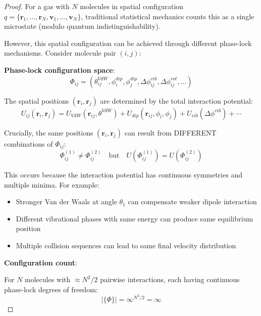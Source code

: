 \documentclass[12pt,a4paper]{article}
\theoremstyle{remark}
\begin{document}
\begin{proof}
For a gas with $N$ molecules in spatial configuration $q = \{\mathbf{r}_1, \ldots, \mathbf{r}_N, \mathbf{v}_1, \ldots, \mathbf{v}_N\}$, traditional statistical mechanics counts this as a single microstate (modulo quantum indistinguishability).

However, this spatial configuration can be achieved through different phase-lock mechanisms. Consider molecule pair $(i,j)$:

\textbf{Phase-lock configuration space}:
\begin{equation}
\Phi_{ij} = (\theta^{VdW}_{ij}, \phi^{dip}_i, \phi^{dip}_j, \Delta\phi^{vib}_{ij}, \Delta\phi^{rot}_{ij}, \ldots)
\end{equation}

The spatial positions $(\mathbf{r}_i, \mathbf{r}_j)$ are determined by the total interaction potential:
\begin{equation}
U_{ij}(\mathbf{r}_i, \mathbf{r}_j) = U_{VdW}(\mathbf{r}_{ij}, \theta^{VdW}) + U_{dip}(\mathbf{r}_{ij}, \phi_i, \phi_j) + U_{vib}(\Delta\phi^{vib}) + \cdots
\end{equation}

Crucially, the same positions $(\mathbf{r}_i, \mathbf{r}_j)$ can result from DIFFERENT combinations of $\Phi_{ij}$:
\begin{equation}
\Phi^{(1)}_{ij} \neq \Phi^{(2)}_{ij} \quad \text{but} \quad U(\Phi^{(1)}_{ij}) = U(\Phi^{(2)}_{ij})
\end{equation}

This occurs because the interaction potential has continuous symmetries and multiple minima. For example:
\begin{itemize}
\item Stronger Van der Waals at angle $\theta_1$ can compensate weaker dipole interaction
\item Different vibrational phases with same energy can produce same equilibrium position
\item Multiple collision sequences can lead to same final velocity distribution
\end{itemize}

\textbf{Configuration count}:

For $N$ molecules with $\approx N^2/2$ pairwise interactions, each having continuous phase-lock degrees of freedom:
\begin{equation}
|\{\Phi\}| = \infty^{N^2/2} = \infty
\end{equation}


\end{proof}
\end{document}
